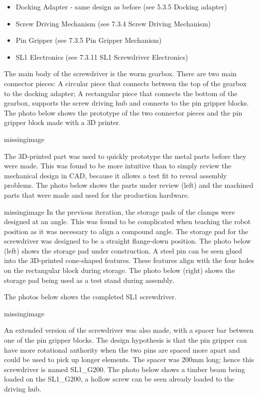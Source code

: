 \begin{itemize}
    \item Docking Adapter - same design as before (see 5.3.5 Docking adapter)
    \item Screw Driving Mechanism (see 7.3.4 Screw Driving Mechanism)
    \item Pin Gripper (see 7.3.5 Pin Gripper Mechanism)
    \item SL1 Electronics (see 7.3.11 SL1 Screwdriver Electronics)
\end{itemize}

The main body of the screwdriver is the worm gearbox. There are two main connector pieces: A circular piece that connects between the top of the gearbox to the docking adapter; A rectangular piece that connects the bottom of the gearbox, supports the screw driving hub and connects to the pin gripper blocks. The photo below shows the prototype of the two connector pieces and the pin gripper block made with a 3D printer.

missingimage

The 3D-printed part was used to quickly prototype the metal parts before they were made. This was found to be more intuitive than to simply review the mechanical design in CAD, because it allows a test fit to reveal assembly problems. The photo below shows the parts under review (left) and the machined parts that were made and used for the production hardware.

missingimage
In the previous iteration, the storage pads of the clamps were designed at an angle. This was found to be complicated when teaching the robot position as it was necessary to align a compound angle. The storage pad for the screwdriver was designed to be a straight flange-down position. The photo below (left) shows the storage pad under construction. A steel pin can be seen glued into the 3D-printed cone-shaped features. These features align with the four holes on the rectangular block during storage. The photo below (right) shows the storage pad being used as a test stand during assembly. 

The photos below shows the completed SL1 screwdriver. 

missingimage

An extended version of the screwdriver was also made, with a spacer bar between one of the pin gripper blocks. The design hypothesis is that the pin gripper can have more rotational authority when the two pins are spaced more apart and could be used to pick up longer elements. The spacer was 200mm long; hence this screwdriver is named SL1\_G200. The photo below shows a timber beam being loaded on the SL1\_G200, a hollow screw can be seen already loaded to the driving hub.

